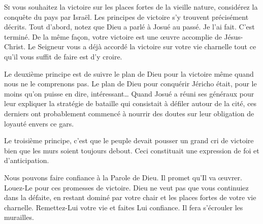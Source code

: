
\lettrine{S}{i} vous souhaitez la victoire sur les places fortes
 de la vieille nature, considérez la conquête du pays par Israël.
 Les principes de victoire s'y trouvent précisément décrits.
 Tout d'abord, notez que Dieu a parlé à Josué au passé.
 \Og Je l'ai fait. C'est terminé. \Fg{}
 De la même fa\c{c}on, votre victoire est une \oe{}uvre accomplie de Jésus-Christ.
 Le Seigneur vous a déjà accordé la victoire sur votre vie charnelle
 \ocadr tout ce qu'il vous suffit de faire est d'y croire.

Le deuxième principe est de suivre le plan de Dieu pour la victoire
 même quand nous ne le comprenons pas.
 Le plan de Dieu pour conquérir Jéricho était,
 pour le moins qu'on puisse en dire, intéressant\dots{}
 Quand Josué a réuni ses généraux pour leur expliquer
 la stratégie de bataille qui consistait à défiler autour de la cité,
 ces derniers ont probablement commencé à nourrir des doutes
 sur leur obligation de loyauté envers ce gars.



Le troisième principe, c'est que le peuple devait pousser
 un grand cri de victoire \ocadr bien que les murs soient toujours debout.
 Ceci constituait une expression de foi et d'anticipation.

Nous pouvons faire confiance à la Parole de Dieu. Il promet qu'Il va \oe{}uvrer.
 Louez-Le pour ces promesses de victoire.
 Dieu ne veut pas que vous continuiez dans la défaite,
 en restant dominé par votre chair et les places fortes de votre vie charnelle.
 Remettez-Lui votre vie et faites Lui confiance.
 Il fera s'écrouler les murailles. 

\dvrule






